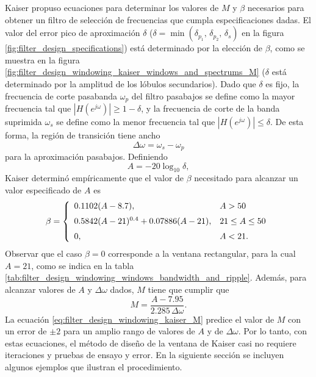 \documentclass[a4paper]{report}
\begin{document}
Kaiser propuso ecuaciones para determinar los valores de \(M\) y \(\beta\) necesarios para obtener un filtro de selección de frecuencias que cumpla especificaciones dadas. El valor del error pico de aproximación \(\delta\) (\(\delta=\min(\delta_{p_1},\,\delta_{p_2},\,\delta_s)\) en la figura \ref{fig:filter_design_specifications}) está determinado por la elección de \(\beta\), como se muestra en la figura \ref{fig:filter_design_windowing_kaiser_windows_and_spectrums_M} (\(\delta\) está determinado por la amplitud de los lóbulos secundarios). Dado que \(\delta\) es fijo, la frecuencia de corte pasabanda \(\omega_p\) del filtro pasabajos se define como la mayor frecuencia tal que \(|H(e^{j\omega})|\geq1-\delta\), y la frecuencia de corte de la banda suprimida \(\omega_s\) se define como la menor frecuencia tal que \(|H(e^{j\omega})|\leq\delta\). De esta forma, la región de transición tiene ancho 
\[
 \Delta\omega=\omega_s-\omega_p
\]
para la aproximación pasabajos. Definiendo
\begin{equation}\label{eq:filter_design_windowing_kaiser_A}
 A=-20\log_{10}\delta, 
\end{equation}
Kaiser determinó empíricamente que el valor de \(\beta\) necesitado para alcanzar un valor especificado de \(A\) es \cite{kaiser1980use}
\begin{equation}\label{eq:filter_design_windowing_kaiser_beta}
 \beta=
 \left\{
  \begin{array}{ll}
   0.1102(A-8.7), & A>50\\[\medskipamount]
   0.5842(A-21)^{0.4}+0.07886(A-21), & 21\leq A\leq 50\\[\medskipamount]
   0, & A<21.
  \end{array}
 \right.
\end{equation}
Observar que el caso \(\beta=0\) corresponde a la ventana rectangular, para la cual \(A=21\), como se indica en la tabla \ref{tab:filter_design_windowing_windows_bandwidth_and_ripple}. Además, para alcanzar valores de \(A\) y \(\Delta\omega\) dados, \(M\) tiene que cumplir que
\begin{equation}\label{eq:filter_design_windowing_kaiser_M}
 M=\frac{A-7.95}{2.285\,\Delta\omega}.
\end{equation}
La ecuación \ref{eq:filter_design_windowing_kaiser_M} predice el valor de \(M\) con un error de \(\pm2\) para un amplio rango de valores de \(A\) y de \(\Delta\omega\). Por lo tanto, con estas ecuaciones, el método de diseño de la ventana de Kaiser casi no requiere iteraciones y pruebas de ensayo y error. En la siguiente sección se incluyen algunos ejemplos que ilustran el procedimiento.
\end{document}
